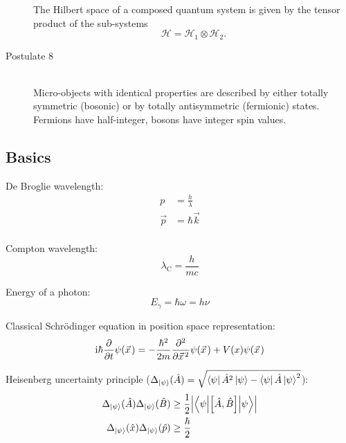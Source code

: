 \begin{description}
				The Hilbert space of a composed quantum system is given by the tensor product of the sub-systems
				\begin{equation}
					\mathcal{H} = \mathcal{H}_1 \otimes \mathcal{H}_2.
				\end{equation}
			\item[Postulate 8]\hfill \\
				Micro-objects with identical properties are described by either totally symmetric (bosonic) or by totally antisymmetric (fermionic) states. Fermions have half-integer, bosons have integer spin values.
	\end{description}

	\subsection{Basics}
		\noindent
		De Broglie wavelength:
		\begin{equation}
			\begin{aligned}
				p &= \frac{h}{\lambda} \\
				\vec{p} &= \hbar \vec{k} \\
			\end{aligned}
		\end{equation}

		\noindent
		Compton wavelength:
		\begin{equation}
			\lambda_\mathrm{C} = \frac{h}{mc}
		\end{equation}

		\noindent
		Energy of a photon:
		\begin{equation}
			E_\gamma = \hbar\omega = h\nu
		\end{equation}

		\noindent
		Classical Schrödinger equation in position space representation:
		\begin{equation}
			\i\hbar\pdv{t}\psi(\vec{x}) = -\frac{\hbar^2}{2m}\frac{\partial^2}{\partial \vec{x}^2}\psi(\vec{x}) + V(x)\psi(\vec{x})
		\end{equation}

		\noindent
		Heisenberg uncertainty principle ($\Delta_{\Ket{\psi}} (\hat{A}) = \sqrt{\Bra{\psi}\hat{A}^2\Ket{\psi} - \Bra{\psi}\hat{A}\Ket{\psi}^2}$):
		\begin{equation}
			\begin{aligned}
				\Delta_{\Ket{\psi}}(\hat{A}) \Delta_{\Ket{\psi}}(\hat{B}) &\ge
				\frac{1}{2} \abs{\mel**{\psi}{\comm{\hat{A}}{\hat{B}}}{\psi}} \\
				\Delta_{\Ket{\psi}}(\hat{x}) \Delta_{\Ket{\psi}}(\hat{p}) &\ge
				\frac{\hbar}{2}
			\end{aligned}
		\end{equation}

